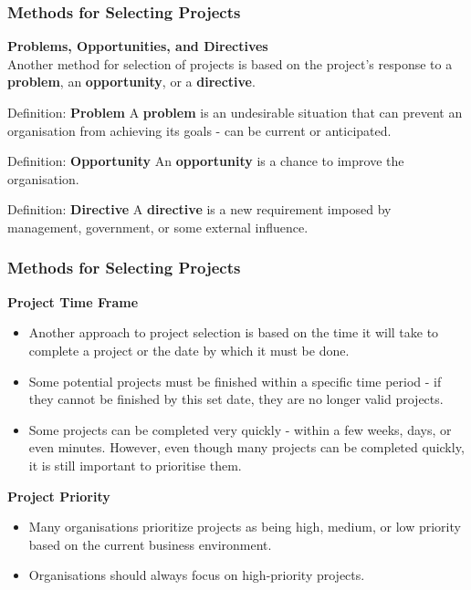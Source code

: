\documentclass{beamer}
\begin{document}
\begin{frame}
\frametitle{Methods for Selecting Projects}
\textbf{Problems, Opportunities, and Directives}\\
\vspace{0.5cm}
Another method for selection of projects is based on the project's response to a \textbf{problem}, an \textbf{opportunity}, or a \textbf{directive}.
\vspace{0.2cm}
\begin{block}{Definition: \textbf{Problem}}
A \textbf{problem} is an undesirable situation that can prevent an organisation from achieving its goals - can be current or anticipated.
\end{block}
\vspace{0.2cm}
\begin{block}{Definition: \textbf{Opportunity}}
An \textbf{opportunity} is a chance to improve the organisation.
\end{block}
\vspace{0.2cm}
\begin{block}{Definition: \textbf{Directive}}
A \textbf{directive} is a new requirement imposed by management, government, or some external influence.
\end{block}
\end{frame}

\begin{frame}
\frametitle{Methods for Selecting Projects}
\textbf{Project Time Frame}
\vspace{0.1cm}
\begin{itemize}
\item Another approach to project selection is based on the time it will take to complete a project or the date by which it must be done.
\item Some potential projects must be finished within a specific time period - if they cannot be finished by this set date, they are no longer valid projects.
\item Some projects can be completed very quickly - within a few weeks, days, or even minutes. However, even though many projects can be completed quickly, it is still important to prioritise them.
\end{itemize}
\vspace{0.5cm}
\textbf{Project Priority}
\vspace{0.1cm}
\begin{itemize}
\item Many organisations prioritize projects as being high, medium, or low priority based on the current business environment.
\item Organisations should always focus on high-priority projects.
\end{itemize}
\end{frame}
\end{document}

